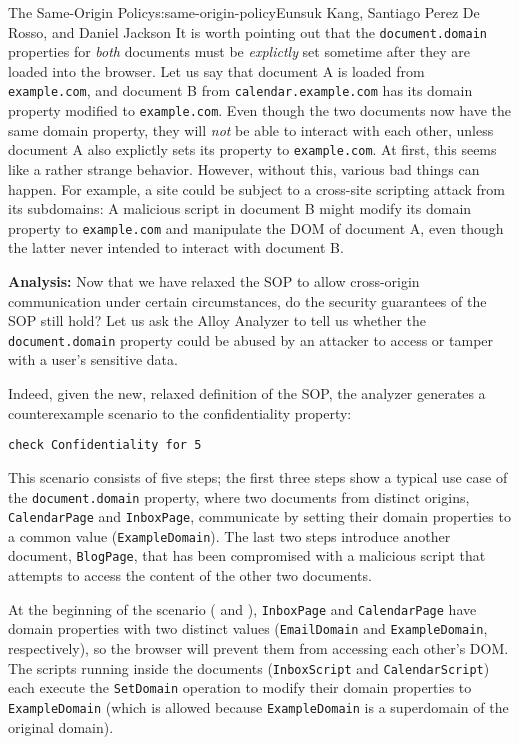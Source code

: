 \begin{aosachapter}{The Same-Origin Policy}{s:same-origin-policy}{Eunsuk Kang, Santiago Perez De Rosso, and Daniel Jackson}
It is worth pointing out that the \texttt{document.domain} properties
for \emph{both} documents must be \emph{explictly} set sometime after
they are loaded into the browser. Let us say that document A is loaded
from \texttt{example.com}, and document B from
\texttt{calendar.example.com} has its domain property modified to
\texttt{example.com}. Even though the two documents now have the same
domain property, they will \emph{not} be able to interact with each
other, unless document A also explictly sets its property to
\texttt{example.com}. At first, this seems like a rather strange
behavior. However, without this, various bad things can happen. For
example, a site could be subject to a cross-site scripting attack from
its subdomains: A malicious script in document B might modify its domain
property to \texttt{example.com} and manipulate the DOM of document A,
even though the latter never intended to interact with document B.

\textbf{Analysis:} Now that we have relaxed the SOP to allow
cross-origin communication under certain circumstances, do the security
guarantees of the SOP still hold? Let us ask the Alloy Analyzer to tell
us whether the \texttt{document.domain} property could be abused by an
attacker to access or tamper with a user's sensitive data.

Indeed, given the new, relaxed definition of the SOP, the analyzer
generates a counterexample scenario to the confidentiality property:

\begin{verbatim}
check Confidentiality for 5
\end{verbatim}

This scenario consists of five steps; the first three steps show a
typical use case of the \texttt{document.domain} property, where two
documents from distinct origins, \texttt{CalendarPage} and
\texttt{InboxPage}, communicate by setting their domain properties to a
common value (\texttt{ExampleDomain}). The last two steps introduce
another document, \texttt{BlogPage}, that has been compromised with a
malicious script that attempts to access the content of the other two
documents.

At the beginning of the scenario
( and
),
\texttt{InboxPage} and \texttt{CalendarPage} have domain properties with
two distinct values (\texttt{EmailDomain} and \texttt{ExampleDomain},
respectively), so the browser will prevent them from accessing each
other's DOM. The scripts running inside the documents
(\texttt{InboxScript} and \texttt{CalendarScript}) each execute the
\texttt{SetDomain} operation to modify their domain properties to
\texttt{ExampleDomain} (which is allowed because \texttt{ExampleDomain}
is a superdomain of the original domain).


\end{aosachapter}

